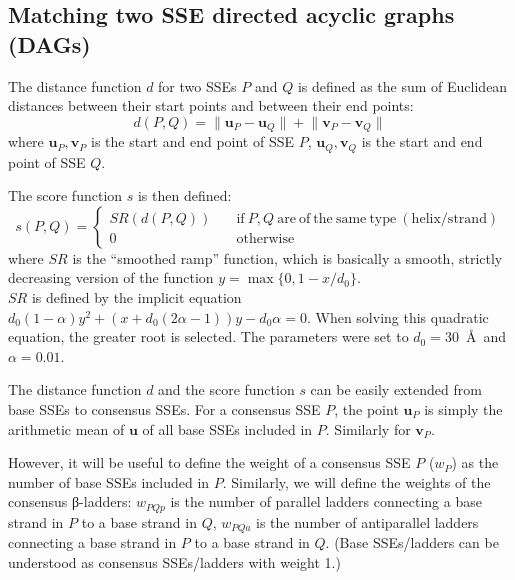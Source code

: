 \documentclass{article}
\begin{document}
\subsection{Matching two SSE directed acyclic graphs (DAGs)}
\label{sec:appendix_matching_dags}

The distance function \(d\) for two SSEs \(P\) and \(Q\) is defined 
as the sum of Euclidean distances between their start points and between their end points:
  \[  d(P, Q) = \lVert \mathbf{u}_P - \mathbf{u}_Q \rVert + \lVert \mathbf{v}_P - \mathbf{v}_Q \rVert  \]
where \(\mathbf{u}_P, \mathbf{v}_P\) is the start and end point of SSE \(P\), 
\(\mathbf{u}_Q, \mathbf{v}_Q\) is the start and end point of SSE \(Q\).

The score function \(s\) is then defined:
  \[
    s(P, Q) = \begin{cases}
                SR(d(P, Q)) \quad & \mathrm{if}\ P, Q\ \mathrm{are\ of\ the\ same\ type\ (helix/strand)} \\
                0           \quad & \mathrm{otherwise}
              \end{cases}
  \]
where \(SR\) is the ``smoothed ramp'' function, which is basically 
a smooth, strictly decreasing version of the function \(y = \max\{0, 1 - x/d_0\} \). \\
\(SR\) is defined by the implicit equation 
\(  d_0 (1 - \alpha) y^2 + (x + d_0 (2\alpha - 1)) y - d_0 \alpha = 0  \).
When solving this quadratic equation, the greater root is selected.
The parameters were set to \(d_0 = 30\)~\AA\ and \(\alpha = 0.01\).

The distance function \(d\) and the score function \(s\) can be easily 
extended from base SSEs to consensus SSEs. 
For a consensus SSE \(P\), the point \(\mathbf{u}_P\) is simply 
the arithmetic mean of \(\mathbf{u}\) of all base SSEs included in \(P\).
Similarly for \(\mathbf{v}_P\).

However, it will be useful to define the weight of a consensus SSE \(P\) (\(w_P\)) 
as the number of base SSEs included in \(P\).
Similarly, we will define the weights of the consensus β-ladders:
\(w_{PQp}\) is the number of parallel ladders connecting 
a base strand in \(P\) to a base strand in \(Q\),
\(w_{PQa}\) is the number of antiparallel ladders connecting 
a base strand in \(P\) to a base strand in \(Q\). 
(Base SSEs/ladders can be understood as consensus SSEs/ladders with weight 1.)
\end{document}
